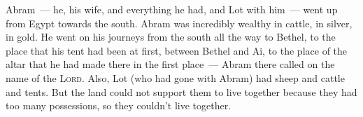 
\begin{inparaenum}
     Abram~--- he, his wife, and everything he had, and Lot with him~--- went up from Egypt towards the south.%
     Abram was incredibly wealthy in cattle, in silver, in gold.%
     He went on his journeys from the south all the way to Bethel, to the place that his tent had been at first, between Bethel and Ai,%
     to the place of the altar that he had made there in the first place~--- Abram there called on the name of the \textsc{Lord}.%
     Also, Lot (who had gone with Abram) had sheep and cattle and tents.%
     But the land could not support them to live together because they had too many possessions, so they couldn't live together.%
\end{inparaenum}
